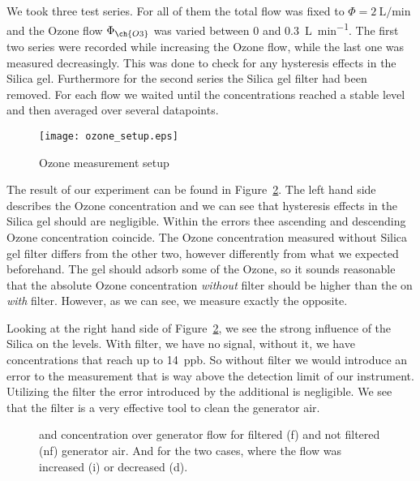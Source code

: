 We took three test series. For all of them the total flow was fixed to
$\Phi = \SI{2}{\liter\per\minute}$ and the Ozone flow $\Phi_{\ch{O3}}$
was varied between \num{0} and \SI{0.3}{\liter\per\minute}. The first
two series were recorded while increasing the Ozone flow, while the
last one was measured decreasingly. This was done to check for any
hysteresis effects in the Silica gel. Furthermore for the second
series the Silica gel filter had been removed. For each flow we waited
until the concentrations reached a stable level and then averaged over
several datapoints.

\begin{figure}[htbp]
  \centering
  \texttt{[image: ozone\_setup.eps]}
  \caption{Ozone measurement setup}
  \label{fig:ozone-flow-setup}
\end{figure}

The result of our experiment can be found in
Figure~\ref{fig:o3-flow}. The left hand side describes the Ozone
concentration and we can see that hysteresis effects in the Silica gel
should are negligible. Within the errors thee ascending and descending
Ozone concentration coincide. The Ozone concentration measured without
Silica gel filter differs from the other two, however differently from
what we expected beforehand. The gel should adsorb some of the Ozone,
so it sounds reasonable that the absolute Ozone concentration
\emph{without} filter should be higher than the on \emph{with}
filter. However, as we can see, we measure exactly the opposite. 

Looking at the right hand side of Figure~\ref{fig:o3-flow}, we see the
strong influence of the Silica on the  levels. With filter, we
have no  signal, without it, we have concentrations that reach
up to \SI{14}{ppb}. So without filter we would introduce an error to
the  measurement that is way above the detection limit of our
instrument. Utilizing the filter the error introduced by the
additional  is negligible. We see that the filter is a very
effective tool to clean the generator air.

\begin{figure}[htbp]
  \centering
  
  \hfill
  
  \caption{ and  concentration over generator flow for
    filtered (f) and not filtered (nf) generator air. And for the two
    cases, where the flow was increased (i) or decreased (d).}
  \label{fig:o3-flow}
\end{figure}

